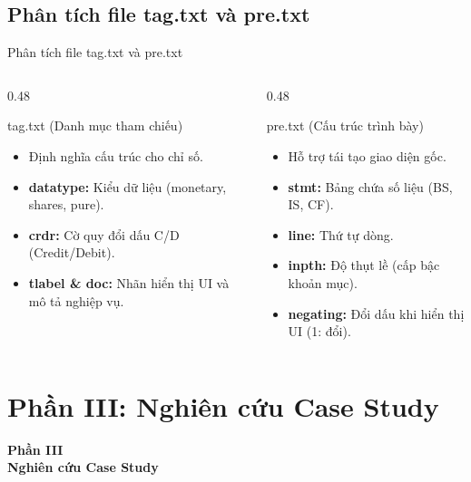 \documentclass[t, aspectratio=169]{beamer} %
\begin{document}
	\subsection{Phân tích file tag.txt và pre.txt}
	\begin{frame}{Phân tích file tag.txt và pre.txt}
		\begin{columns}[T]
			\begin{column}{0.48\textwidth}
				\begin{block}{tag.txt (Danh mục tham chiếu)}
					\begin{itemize}
						\item Định nghĩa cấu trúc cho chỉ số.
						\item \textbf{datatype:} Kiểu dữ liệu (monetary, shares, pure).
						\item \textbf{crdr:} Cờ quy đổi dấu C/D (Credit/Debit).
						\item \textbf{tlabel \& doc:} Nhãn hiển thị UI và mô tả nghiệp vụ.
					\end{itemize}
				\end{block}
			\end{column}
			
			\begin{column}{0.48\textwidth}
				\begin{block}{pre.txt (Cấu trúc trình bày)}
					\begin{itemize}
						\item Hỗ trợ tái tạo giao diện gốc.
						\item \textbf{stmt:} Bảng chứa số liệu (BS, IS, CF).
						\item \textbf{line:} Thứ tự dòng.
						\item \textbf{inpth:} Độ thụt lề (cấp bậc khoản mục).
						\item \textbf{negating:} Đổi dấu khi hiển thị UI (1: đổi).
					\end{itemize}
				\end{block}
			\end{column}
		\end{columns}
	\end{frame}
	
	\useStyleHustFull
	\useThinBar 
	
	\section{Phần III: Nghiên cứu Case Study}
	\begin{frame}
		\vfill
		\centering
		{\Huge \textbf{Phần III}} \\[1em]
		{\huge \textbf{Nghiên cứu Case Study}}
		\vfill
	\end{frame}
	
\end{document}
